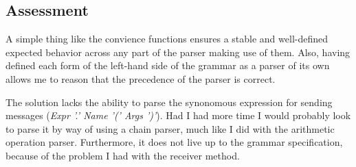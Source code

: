 %
%

\subsection{Assessment}
A simple thing like the convience functions ensures a stable and well-defined
expected behavior across any part of the parser making use of them. Also,
having defined each form of the left-hand side of the grammar as a parser of
its own allows me to reason that the precedence of the parser is correct.

The solution lacks the ability to parse the synonomous expression for sending
messages ({\it Expr '.' Name '(' Args ')'}). Had I had more time I would
probably look to parse it by way of using a chain parser, much like I did with
the arithmetic operation parser. Furthermore, it does not live up to the
grammar specification, because of the problem I had with the receiver method.
